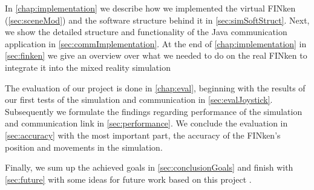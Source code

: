     In \ref{chap:implementation} we describe how we implemented the virtual FINken (\ref{sec:sceneMod}) and the software structure behind it in \ref{sec:simSoftStruct}. 
    Next, we show the detailed structure and functionality of the Java communication application in \ref{sec:commImplementation}.
    At the end of \ref{chap:implementation} in \ref{sec:finken} we give an overview over what we needed to do on the real FINken to integrate it into the mixed reality simulation
    
    The evaluation of our project is done in \ref{chap:eval}, beginning with the results of our first tests of the simulation and communication in \ref{sec:evalJoystick}.
    Subsequently we formulate the findings regarding performance of the simulation and communication link in \ref{sec:performance}.
    We conclude the evaluation in \ref{sec:accuracy} with the most important part, the accuracy of the FINken's position and movements in the simulation.
    
    Finally, we sum up the achieved goals in \ref{sec:conclusionGoals} and finish with \ref{sec:future} with some ideas for future work based on this project . 
    